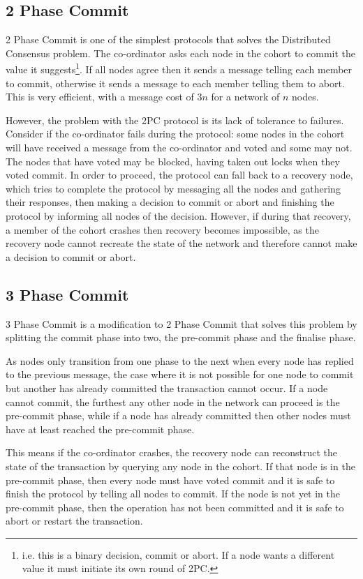 \documentclass[12pt,twoside,notitlepage]{report}
\begin{document}
\subsection*{2 Phase Commit}

2 Phase Commit is one of the simplest protocols that solves the Distributed Consensus problem. The
co-ordinator asks each node in the cohort to commit the value it suggests\footnote{i.e. this is
a binary decision, commit or abort. If a node wants a different value it must initiate its own
round of 2PC.}. If all nodes agree then it sends a message telling each member to commit, otherwise
it sends a message to each member telling them to abort. This is very efficient, with a message
cost of $3n$ for a network of $n$ nodes.

However, the problem with the 2PC protocol is its lack of tolerance to failures. Consider if the
co-ordinator fails during the protocol: some nodes in the cohort will have received a message from
the co-ordinator and voted and some may not. The nodes that have voted may be blocked, having
taken out locks when they voted commit. In order to proceed, the protocol can fall back to a
recovery node, which tries to complete the protocol by messaging all the nodes and gathering their
responses, then making a decision to commit or abort and finishing the protocol by informing all
nodes of the decision. However, if during that recovery, a member of the cohort crashes then
recovery becomes impossible, as the recovery node cannot recreate the state of the network and
therefore cannot make a decision to commit or abort.

\subsection*{3 Phase Commit}

3 Phase Commit is a modification to 2 Phase Commit that solves this problem by splitting the commit
phase into two, the pre-commit phase and the finalise phase.

As nodes only transition from one phase to the next when every node has replied to the previous
message, the case where it is not possible for one node to commit but another has already
committed the transaction cannot occur. If a node cannot commit, the furthest any other node in
the network can proceed is the pre-commit phase, while if a node has already committed then other
nodes must have at least reached the pre-commit phase.

This means if the co-ordinator crashes, the recovery node can reconstruct the state of the
transaction by querying any node in the
cohort. If that node is in the pre-commit phase, then every node must have voted commit and it is
safe to finish the protocol by telling all nodes to commit. If the node is not yet in the pre-commit
phase, then the operation has not been committed and it is safe to abort or restart the
transaction.
\end{document}
